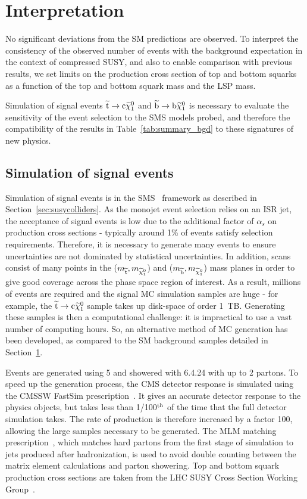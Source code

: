 %
\section{Interpretation} 
\label{sec:GEN}

No significant deviations from the \ac{SM} predictions are observed. 
To interpret the consistency of the observed number of events with
the background expectation in the context of compressed \ac{SUSY}, and also to
enable comparison with previous results, we set limits on the production cross section of top and bottom squarks as a function of the top and bottom squark mass and the LSP mass. 

Simulation of signal events 
$\widetilde{{\rm t}}\rightarrow{\rm c}\widetilde{\chi}^{0}_{1}$ and 
$\widetilde{{\rm b}}\rightarrow{\rm b}\widetilde{\chi}^{0}_{1}$ is necessary to evaluate the sensitivity of the event selection to the \ac{SMS} models probed, and therefore the compatibility of the results in Table~\ref{tab:summary_bgd} to these signatures of new physics.

\subsection{Simulation of signal events}

Simulation of signal events is in the \ac{SMS}~\cite{bib:SMS} framework as described in Section~\ref{sec:susycolliders}. 
As the monojet event selection relies on an \ac{ISR} jet, the acceptance of signal events is low due to the additional factor of $\alpha_s$ on production cross sections - typically around 1\% of events satisfy selection requirements. 
Therefore, it is necessary to generate many events to ensure uncertainties are not dominated by statistical uncertainties. 
In addition, scans consist of many points in the ($m_{\widetilde{{\rm t}}}, m_{\widetilde{\chi}^{0}_{1}}$) and ($m_{\widetilde{{\rm b}}}, m_{\widetilde{\chi}^{0}_{1}}$) mass planes in order to give good coverage across the phase space region of interest. 
As a result, millions of events are required and the signal MC simulation samples are huge - for example, the $\widetilde{{\rm t}} \rightarrow {\rm c} \widetilde{\chi}^{0}_{1}$ sample takes up disk-space of order 1~TB.
Generating these samples is then a computational challenge: 
it is impractical to use a vast number of computing hours. 
So, an alternative method of MC generation has been developed, as compared to the \ac{SM} background samples detailed in Section~\ref{sec:GEN}.

Events are generated using \MADGRAPH{}5 and showered with \PYTHIA{}6.4.24 with up to 2 partons. To speed up the generation process, the CMS detector response is simulated using the CMSSW FastSim prescription~\cite{FASTSIM}. 
It gives an accurate detector response to the physics objects, but takes less than 1/100$^{\rm th}$ of the time that the full \GEANTfour detector simulation takes. 
The rate of production is therefore increased by a factor 100, allowing the large samples necessary to be generated.
The MLM matching prescription~\cite{MLMmatching}, which matches hard partons from the first stage of simulation to jets produced after hadronization, is used to avoid double counting between the matrix element calculations and parton showering.
Top and bottom squark production cross sections are taken from the LHC SUSY Cross Section Working Group~\cite{bib:SUSYxs}.

